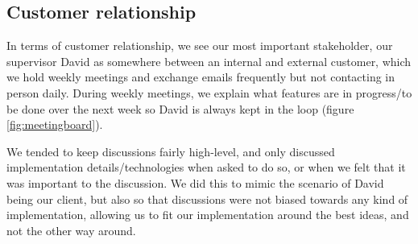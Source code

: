 \documentclass[a4paper]{article}
\begin{document}
\subsection{Customer relationship}
In terms of customer relationship, we see our most important stakeholder, 
our supervisor David as somewhere 
between an internal and external customer, which we hold weekly meetings
and exchange emails frequently but not contacting in person daily. 
During weekly meetings, we explain what features are in progress/to be done
over the next week so David is always kept in the loop (figure 
\ref{fig:meetingboard}).

We tended to keep discussions fairly high-level, and only discussed implementation 
details/technologies when asked to do so, or when we felt that it was 
important to the discussion. We did this to mimic the scenario of David 
being our client, but also so that discussions were not biased towards any 
kind of implementation, allowing us to fit our implementation around the best 
ideas, and not the other way around.
\end{document}
